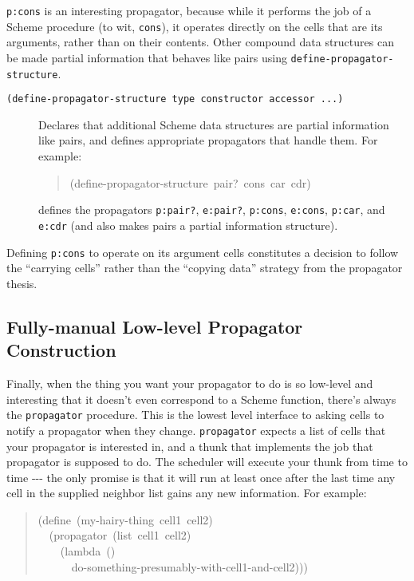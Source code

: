 \documentclass[12pt,letterpaper,english]{article}
\begin{document}
\texttt{p:cons} is an interesting propagator, because while it performs the
job of a Scheme procedure (to wit, \texttt{cons}), it operates directly on
the cells that are its arguments, rather than on their contents.
Other compound data structures can be made partial information that
behaves like pairs using \texttt{define-propagator-structure}.
\begin{description}
\item[{\texttt{(define-propagator-structure type constructor accessor ...)}}] \leavevmode 
Declares that additional Scheme data structures are partial
information like pairs, and defines appropriate propagators
that handle them.  For example:
\begin{quote}{\ttfamily \raggedright \noindent
(define-propagator-structure~pair?~cons~car~cdr)
}\end{quote}
defines the propagators \texttt{p:pair?}, \texttt{e:pair?}, \texttt{p:cons},
\texttt{e:cons}, \texttt{p:car}, and \texttt{e:cdr} (and also makes pairs
a partial information structure).

\end{description}

Defining \texttt{p:cons} to operate on its argument cells constitutes a
decision to follow the ``carrying cells'' rather than the ``copying data''
strategy from the propagator thesis.



\hypertarget{fully-manual-low-level-propagator-construction}{}
\subsection{Fully-manual Low-level Propagator Construction}
\label{fully-manual-low-level-propagator-construction}

Finally, when the thing you want your propagator to do is so low-level and
interesting that it doesn't even correspond to a Scheme function,
there's always the \texttt{propagator} procedure.  This is the lowest level
interface to asking cells to notify a propagator when they change.
\texttt{propagator} expects a list of cells that your propagator is
interested in, and a thunk that implements the job that propagator is
supposed to do.  The scheduler will execute your thunk from time to
time -{}-{}- the only promise is that it will run at least once after the
last time any cell in the supplied neighbor list gains any new
information.  For example:
\begin{quote}{\ttfamily \raggedright \noindent
(define~(my-hairy-thing~cell1~cell2)~\\
~~(propagator~(list~cell1~cell2)~\\
~~~~(lambda~()~\\
~~~~~~do-something-presumably-with-cell1-and-cell2)))
}\end{quote}
\end{document}

